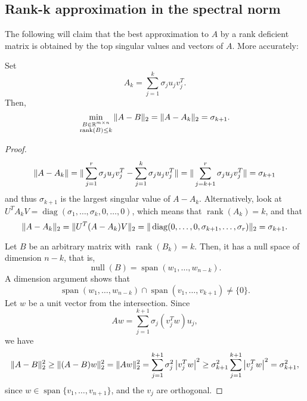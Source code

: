 \documentclass{article}
\begin{document}
\subsection*{Rank-k approximation in the spectral norm}
The following will claim that the best approximation to $A$ by a rank deficient 
matrix is obtained by the top singular values and vectors of $A$. More accurately:
\begin{fact}
Set
\begin{equation*}
A_{k} = \sum_{j=1}^{k} \sigma_{j} u_{j} v_{j}^{T}.
\end{equation*}
Then,
\begin{equation*}
\min_{\substack{B \in \mathbb{R}^{m \times n} \\
\operatorname{rank}(B) \leq k}} \| A-B \|_{2} = \| A-A_{k} \|_{2}
= \sigma_{k+1}.
\end{equation*}
\end{fact}


\begin{proof}
\begin{equation*}
\| A-A_{k} \| = \| \sum_{j=1}^{r} \sigma_{j} u_{j} v_{j}^{T} - \sum_{j=1}^{k}
\sigma_{j} u_{j} v_{j}^{T} \| = \| \sum_{j=k+1}^{r} \sigma_{j} u_{j}
v_{j}^{T} \| = \sigma_{k+1} 
\end{equation*}
and thus $\sigma_{k+1}$ is the largest singular value of $A-A_{k}$.
Alternatively, look at $U^{T} A_{k} V =
\operatorname{diag}(\sigma_{1},\ldots,\sigma_{k},0,\ldots,0)$, which
means that $\operatorname{rank}(A_{k}) = k$, and that
\begin{equation*}
\| A-A_{k} \|_{2} = \| U^{T} (A-A_{k}) V \|_{2} =
\| \operatorname{diag}(0,\ldots,0,\sigma_{k+1},\ldots,\sigma_{r}) \|_{2}
= \sigma_{k+1}.
\end{equation*}

Let $B$ be an arbitrary matrix with $\operatorname{rank}(B_{k}) =
k$. Then, it has a null space of dimension $n-k$, that is,
\begin{equation*}
\operatorname{null}(B) = \operatorname{span}(w_{1},\ldots,w_{n-k}).
\end{equation*}
A dimension argument shows that
\begin{equation*}
\operatorname{span}(w_{1},\ldots,w_{n-k}) \cap
\operatorname{span}(v_{1},\ldots,v_{k+1}) \ne \{ 0 \}.
\end{equation*}
Let $w$ be a unit vector from the intersection. Since
\begin{equation*}
Aw = \sum_{j=1}^{k+1} \sigma_{j} (v_{j}^{T}w) u_{j},
\end{equation*}
we have
\begin{equation*}
\| A-B \|_{2}^{2} \ge \| (A-B)w \|_{2}^{2} = \| Aw \|_{2}^{2} =
\sum_{j=1}^{k+1} \sigma_{j}^{2} \left| v_{j}^{T}w \right|^{2} \ge
\sigma_{k+1}^{2} \sum_{j=1}^{k+1} \left| v_{j}^{T}w \right|^{2} =
\sigma_{k+1}^{2},
\end{equation*}
since $w \in \operatorname{span}\{v_{1},\ldots,v_{n+1}\}$, and the
$v_{j}$ are orthogonal.
\end{proof}
\end{document}
